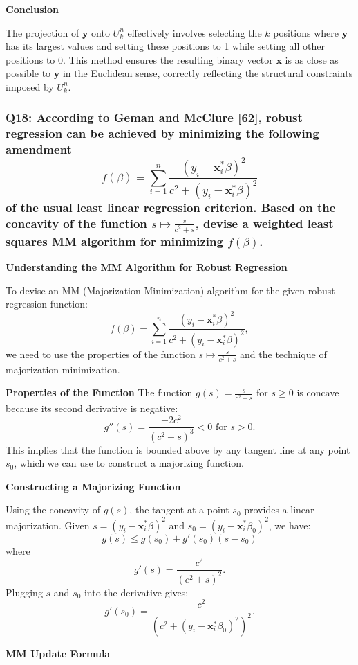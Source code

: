 \documentclass[8pt]{article}
\begin{document}
\textbf{Conclusion}

The projection of \(\mathbf{y}\) onto \(U_k^n\) effectively involves selecting the \(k\) positions where \(\mathbf{y}\) has its largest values and setting these positions to 1 while setting all other positions to 0. This method ensures the resulting binary vector \(\mathbf{x}\) is as close as possible to \(\mathbf{y}\) in the Euclidean sense, correctly reflecting the structural constraints imposed by \( U_k^n \).


\subsubsection*{Q18: According to Geman and McClure [62], robust regression can be achieved by minimizing the following amendment
\[
f(\beta) = \sum_{i=1}^{n} \frac{(y_i - \mathbf{x}_i^* \beta)^2}{c^2 + (y_i - \mathbf{x}_i^* \beta)^2}
\]
of the usual least linear regression criterion. Based on the concavity of the function \(s \mapsto \frac{s}{c^2 + s}\), devise a weighted least squares MM algorithm for minimizing \(f(\beta)\).}

\textbf{Understanding the MM Algorithm for Robust Regression}

To devise an MM (Majorization-Minimization) algorithm for the given robust regression function:
\[ f(\beta) = \sum_{i=1}^{n} \frac{(y_i - \mathbf{x}_i^* \beta)^2}{c^2 + (y_i - \mathbf{x}_i^* \beta)^2}, \]
we need to use the properties of the function \(s \mapsto \frac{s}{c^2 + s}\) and the technique of majorization-minimization.

\textbf{Properties of the Function}
The function \(g(s) = \frac{s}{c^2 + s}\) for \(s \geq 0\) is concave because its second derivative is negative:
\[ g''(s) = \frac{-2c^2}{(c^2+s)^3} < 0 \text{ for } s > 0. \]
This implies that the function is bounded above by any tangent line at any point \(s_0\), which we can use to construct a majorizing function.

\textbf{Constructing a Majorizing Function}

Using the concavity of \(g(s)\), the tangent at a point \(s_0\) provides a linear majorization. Given \(s = (y_i - \mathbf{x}_i^* \beta)^2\) and \(s_0 = (y_i - \mathbf{x}_i^* \beta_0)^2\), we have:
\[ g(s) \leq g(s_0) + g'(s_0)(s-s_0) \]
where
\[ g'(s) = \frac{c^2}{(c^2 + s)^2}. \]
Plugging \(s\) and \(s_0\) into the derivative gives:
\[ g'(s_0) = \frac{c^2}{(c^2 + (y_i - \mathbf{x}_i^* \beta_0)^2)^2}. \]

\textbf{MM Update Formula}
\end{document}
